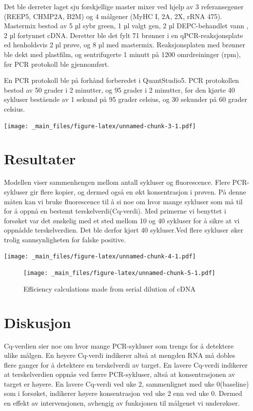 \documentclass[
]{book}
\begin{document}
Det ble derreter laget sju forskjellige master mixer ved hjelp av 3 referansegener (REEP5, CHMP2A, B2M) og 4 målgener (MyHC I, 2A, 2X, rRNA 475). Mastermix bestod av 5 µl sybr green, 1 µl valgt gen, 2 µl DEPC-behandlet vann , 2 µl fortynnet cDNA. Deretter ble det fylt 71 brønner i en qPCR-reaksjonsplate ed henholdsvis 2 µl prøve, og 8 µl med mastermix. Reaksjonsplaten med brønner ble dekt med plastfilm, og sentrifugerte 1 minutt på 1200 omrdreininger (rpm), før PCR protokoll ble gjennomført.

En PCR protokoll ble på forhånd forberedet i QuantStudio5. PCR protokollen bestod av 50 grader i 2 minutter, og 95 grader i 2 minutter, før den kjørte 40 sykluser bestående av 1 sekund på 95 grader celsius, og 30 sekunder på 60 grader celsius.

\texttt{[image: \_main\_files/figure-latex/unnamed-chunk-3-1.pdf]}

\hypertarget{resultater-1}{%
\section{Resultater}\label{resultater-1}}

Modellen viser sammenhengen mellom antall sykluser og fluorescence. Flere PCR-sykluser gir flere kopier, og dermed også en økt konsentrasjon i prøven. På denne måten kan vi bruke fluorescence til å si noe om hvor mange sykluser som må til for å oppnå en bestemt terskelverdi(Cq-verdi). Med primerne vi benyttet i forsøket var det ønskelig med et sted mellom 10 og 40 sykluser for å sikre at vi oppnådde terskelverdien. Det ble derfor kjørt 40 sykluser.Ved flere sykluser øker trolig sannsynligheten for falske positive.

\texttt{[image: \_main\_files/figure-latex/unnamed-chunk-4-1.pdf]}

\begin{figure}
\centering
\texttt{[image: \_main\_files/figure-latex/unnamed-chunk-5-1.pdf]}
\caption{\label{fig:unnamed-chunk-5}Efficiency calculations made from serial dilution of cDNA}
\end{figure}

\hypertarget{diskusjon-1}{%
\section{Diskusjon}\label{diskusjon-1}}

Cq-verdien sier noe om hvor mange PCR-sykluser som trengs for å detektere ulike målgen\citep{kuang2018}. En høyere Cq-verdi indikerer altså at mengden RNA må dobles flere ganger for å detektere en terskelverdi av target. En lavere Cq-verdi indikerer at terskelverdien oppnås ved færre PCR-sykluser, altså at konsentrasjonen av target er høyere. En lavere Cq-verdi ved uke 2, sammenlignet med uke 0(baseline) som i forsøket, indikerer høyere konsentrasjon ved uke 2 enn ved uke 0. Dermed en effekt av intervensjonen, avhengig av funksjonen til målgenet vi underøkser.
\end{document}
